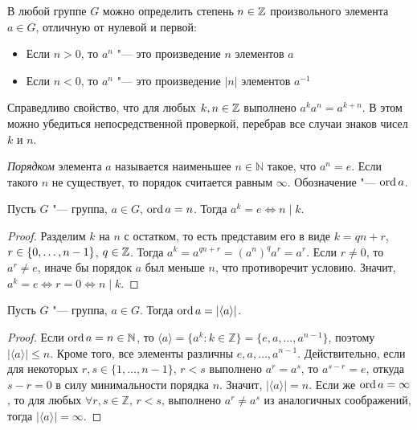 \begin{note}
	В любой группе $G$ можно определить степень $n \in \mathbb{Z}$ произвольного элемента $a \in G$, отличную от нулевой и первой:
	\begin{itemize}
		\item Если $n > 0$, то $a^n$ "--- это произведение $n$ элементов $a$
		\item Если $n < 0$, то $a^n$ "--- это произведение $|n|$ элементов $a^{-1}$
	\end{itemize}

	Справедливо свойство, что для любых $k, n \in \mathbb{Z}$ выполнено $a^{k}a^{n} = a^{k + n}$. В этом можно убедиться непосредственной проверкой, перебрав все случаи знаков чисел $k$ и $n$.
\end{note}

\begin{definition}
	\textit{Порядком} элемента $a$ называется наименьшее $n \in \mathbb{N}$ такое, что $a^n = e$. Если такого $n$ не существует, то порядок считается равным $\infty$. Обозначение "--- $\operatorname{ord}{a}$.
\end{definition}

\begin{proposition}
	Пусть $G$ "--- группа, $a \in G$, $\operatorname{ord}{a} = n$. Тогда $a^k = e \Leftrightarrow n \mid k$.
\end{proposition}

\begin{proof}
	Разделим $k$ на $n$ с остатком, то есть представим его в виде $k = qn + r$, $r \hm{\in} \{0, \dots, n-1\}$, $q \in \mathbb{Z}$. Тогда $a^k = a^{qn + r} = (a^n)^qa^r = a^r$. Если $r \ne 0$, то $a^r \ne e$, иначе бы порядок $a$ был меньше $n$, что противоречит условию. Значит, $a^k = e \Leftrightarrow r = 0 \Leftrightarrow n \mid k$.
\end{proof}

\begin{proposition}
	Пусть $G$ "--- группа, $a \in G$. Тогда $\operatorname{ord}{a} = |\langle a\rangle|$.
\end{proposition}

\begin{proof}
	Если $\operatorname{ord}{a} = n \in \mathbb{N}$, то $\langle a\rangle = \{a^k: k \in \mathbb{Z}\} = \{e, a, \dots, a^{n-1}\}$, поэтому $|\langle a\rangle| \le n$. Кроме того, все элементы различны $e, a, \dots, a^{n-1}$. \pagebreak Действительно, если для некоторых $r, s \in \{1, \dots, n-1\}$, $r < s$ выполнено $a^r = a^s$, то $a^{s - r} = e$, откуда $s - r = 0$ в силу минимальности порядка $n$. Значит, $|\langle a\rangle| = n$. Если же $\operatorname{ord}{a} = \infty$, то для любых $\forall r, s \in \mathbb{Z}$, $r < s$, выполнено $a^r \ne a^s$ из аналогичных соображений, тогда $|\langle a\rangle| = \infty$.
\end{proof}


